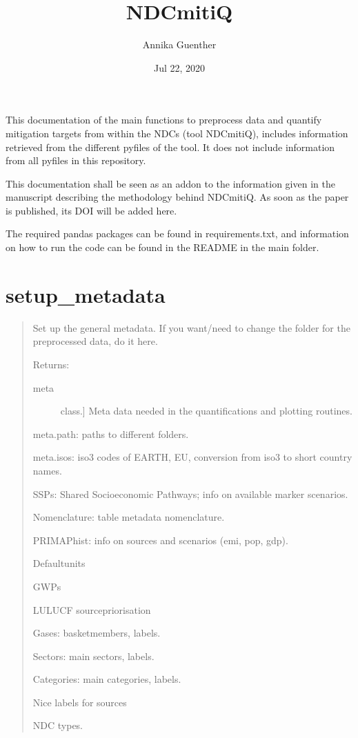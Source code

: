 \documentclass[letterpaper,10pt,english]{sphinxmanual}
\title{NDCmitiQ}
\date{Jul 22, 2020}
\author{Annika Guenther}
\begin{document}
\pagestyle{empty}
\sphinxmaketitle
\pagestyle{plain}
\sphinxtableofcontents
\pagestyle{normal}
\label{\detokenize{index::doc}}


 

This documentation of the main functions to preprocess data and quantify mitigation
targets from within the NDCs (tool NDCmitiQ), includes information retrieved from the
different py\sphinxhyphen{}files of the tool.
It does not include information from all py\sphinxhyphen{}files in this repository.

This documentation shall be seen as an add\sphinxhyphen{}on to the information given in the
manuscript describing the methodology behind NDCmitiQ.
As soon as the paper is published, its DOI will be added here.

The required pandas packages can be found in requirements.txt,
and information on how to run the code can be found in the README in the main folder.


\chapter{setup\_metadata}
\label{\detokenize{code:setup-metadata}}\label{\detokenize{code::doc}}
\begin{quote}

Set up the general metadata.
If you want/need to change the folder for the preprocessed data, do it here.

Returns:
\begin{description}
\item[{meta}] \leavevmode{[}class.{]}
Meta data needed in the quantifications and plotting routines.

\end{description}

meta.path: paths to different folders.

meta.isos: iso3 codes of EARTH, EU, conversion from iso3 to short country names.

SSPs: Shared Socioeconomic Pathways; info on available marker scenarios.

Nomenclature: table meta\sphinxhyphen{}data nomenclature.

PRIMAP\sphinxhyphen{}hist: info on sources and scenarios (emi, pop, gdp).

Default\sphinxhyphen{}units

GWPs

LULUCF source\sphinxhyphen{}priorisation

Gases: basket\sphinxhyphen{}members, labels.

Sectors: main sectors, labels.

Categories: main categories, labels.

Nice labels for sources

NDC types.
\end{quote}
\end{document}
